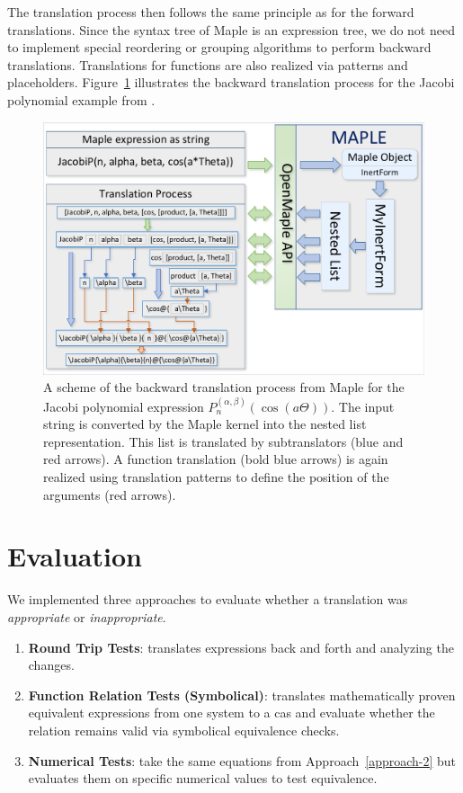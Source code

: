 \documentclass[a4paper,11pt]{article}
\newcommand{\Maple}{Maple}
\theoremstyle{defTheoStyle}
\theoremstyle{defExampStyle}
\begin{document}
The translation process then follows the same principle as for the forward translations. Since the syntax tree of \Maple{} is an expression tree, we do not need to implement special reordering or grouping algorithms to perform backward translations. Translations for functions are also realized via patterns and placeholders. Figure~\ref{fig:backward-trans} illustrates the backward translation process for the Jacobi polynomial example from .

\begin{figure}[t!]
	\centering
	\includegraphics[clip, trim=0.1cm 0.1cm 0.1cm 0.1cm, scale=0.7]{MapleTranslation.pdf}
	\caption{A scheme of the backward translation process from \Maple{} for the Jacobi polynomial expression $P_n^{(\alpha , \beta)}(\cos(a\Theta))$. The input string is converted by the \Maple{} kernel into the nested list representation. This list is translated by subtranslators (blue and red arrows). A function translation (bold blue arrows) is again realized using translation patterns to define the position of the arguments (red arrows).}
	\label{fig:backward-trans}
\end{figure}
 
\section{Evaluation}\label{sec:evaluation}
We implemented three approaches to evaluate whether a translation was \textit{appropriate} or \textit{inappropriate}.
\begin{enumerate}
\item \textbf{Round Trip Tests}: translates expressions back and forth and analyzing the changes.
\item\label{approach-2} \textbf{Function Relation Tests (Symbolical)}: translates mathematically proven equivalent expressions from one system to a \gls*{cas} and evaluate whether the relation remains valid via symbolical equivalence checks.
\item \textbf{Numerical Tests}: take the same equations from Approach~\ref{approach-2} but evaluates them on specific numerical values to test equivalence.
\end{enumerate}
\end{document}

